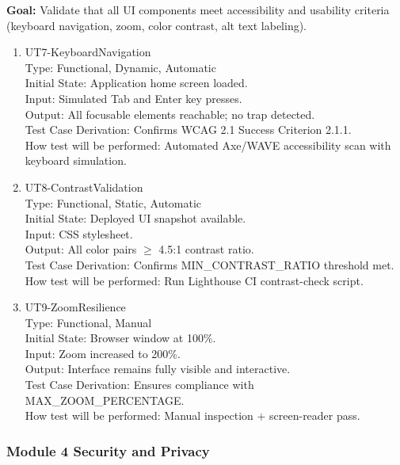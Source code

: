 \documentclass[12pt, titlepage]{article}
\begin{document}
\textbf{Goal:} Validate that all UI components meet accessibility and
usability criteria (keyboard navigation, zoom, color contrast, alt
text labeling).

\begin{enumerate}
\item{UT7-KeyboardNavigation\\}
  Type: Functional, Dynamic, Automatic\\
  Initial State: Application home screen loaded.\\
  Input: Simulated Tab and Enter key presses.\\
  Output: All focusable elements reachable; no trap detected.\\
  Test Case Derivation: Confirms WCAG 2.1 Success Criterion 2.1.1.\\
  How test will be performed: Automated Axe/WAVE accessibility scan
  with keyboard simulation.

\item{UT8-ContrastValidation\\}
  Type: Functional, Static, Automatic\\
  Initial State: Deployed UI snapshot available.\\
  Input: CSS stylesheet.\\
  Output: All color pairs $\geq$ 4.5:1 contrast ratio.\\
  Test Case Derivation: Confirms MIN\_CONTRAST\_RATIO threshold met.\\
  How test will be performed: Run Lighthouse CI contrast-check script.

\item{UT9-ZoomResilience\\}
  Type: Functional, Manual\\
  Initial State: Browser window at 100\%.\\
  Input: Zoom increased to 200\%.\\
  Output: Interface remains fully visible and interactive.\\
  Test Case Derivation: Ensures compliance with MAX\_ZOOM\_PERCENTAGE.\\
  How test will be performed: Manual inspection + screen-reader pass.
\end{enumerate}

\subsubsection{Module 4 \textemdash{} Security and Privacy}
\end{document}
